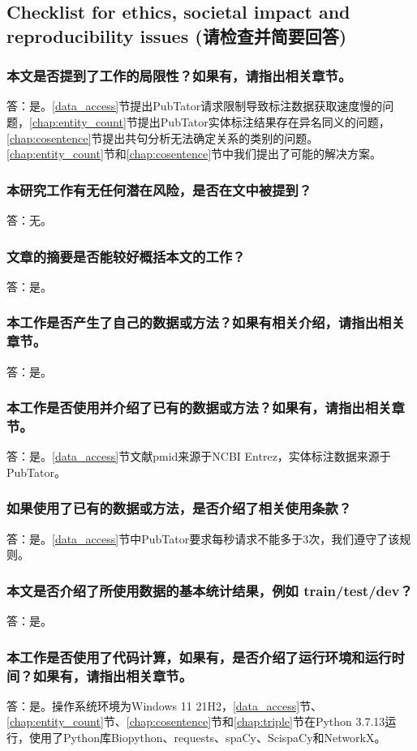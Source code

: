 \documentclass[twocolumn]{article}
\begin{document}
\subsection{Checklist for ethics, societal impact and reproducibility issues (请检查并简要回答)}

\subsubsection{本文是否提到了工作的局限性？如果有，请指出相关章节。}
答：是。\ref{data_access}节提出PubTator请求限制导致标注数据获取速度慢的问题，\ref{chap:entity_count}节提出PubTator实体标注结果存在异名同义的问题，\ref{chap:cosentence}节提出共句分析无法确定关系的类别的问题。\ref{chap:entity_count}节和\ref{chap:cosentence}节中我们提出了可能的解决方案。
\subsubsection{本研究工作有无任何潜在风险，是否在文中被提到？}
答：无。
\subsubsection{文章的摘要是否能较好概括本文的工作？}
答：是。
\subsubsection{本工作是否产生了自己的数据或方法？如果有相关介绍，请指出相关章节。}
答：是。
\subsubsection{本工作是否使用并介绍了已有的数据或方法？如果有，请指出相关章节。}
答：是。\ref{data_access}节文献pmid来源于NCBI Entrez，实体标注数据来源于PubTator。
\subsubsection{如果使用了已有的数据或方法，是否介绍了相关使用条款？}
答：是。\ref{data_access}节中PubTator要求每秒请求不能多于3次，我们遵守了该规则。
\subsubsection{本文是否介绍了所使用数据的基本统计结果，例如 train/test/dev？}
答：是。
\subsubsection{本工作是否使用了代码计算，如果有，是否介绍了运行环境和运行时间？如果有，请指出相关章节。}
答：是。操作系统环境为Windows 11 21H2，\ref{data_access}节、\ref{chap:entity_count}节、\ref{chap:cosentence}节和\ref{chap:triple}节在Python 3.7.13运行，使用了Python库Biopython、requests、spaCy、ScispaCy和NetworkX。
\end{document}
